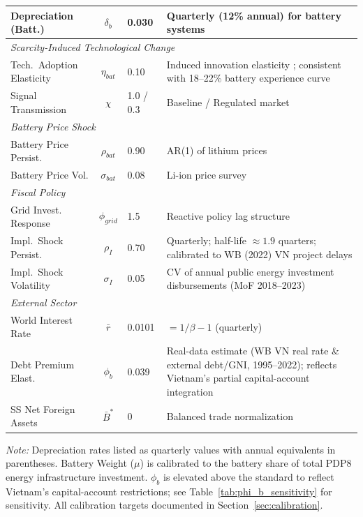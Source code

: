 \documentclass[12pt, a4paper]{article}
\begin{document}
\begin{table}[H]
\begin{tabular}{l c l p{6.5cm}}
        Depreciation (Batt.) & $\delta_b$ & 0.030 & Quarterly (12\% annual) for battery systems \\
        \midrule
        \multicolumn{4}{l}{\textit{Scarcity-Induced Technological Change}} \\
        Tech.\ Adoption Elasticity & $\eta_{bat}$ & 0.10 & Induced innovation elasticity \citep{popp2002}; consistent with 18--22\% battery experience curve \citep{kittner2017,way2022} \\
        Signal Transmission & $\chi$ & 1.0 / 0.3 & Baseline / Regulated market \\
        \midrule
        \multicolumn{4}{l}{\textit{Battery Price Shock}} \\
        Battery Price Persist. & $\rho_{bat}$ & 0.90 & AR(1) of lithium prices \citep{bloombergnef2023} \\
        Battery Price Vol. & $\sigma_{bat}$ & 0.08 & \citet{bloombergnef2023} Li-ion price survey \\
        \midrule
        \multicolumn{4}{l}{\textit{Fiscal Policy}} \\
        Grid Invest. Response & $\phi_{grid}$ & 1.5 & Reactive policy lag structure \citep{worldbank2022} \\
        Impl.\ Shock Persist. & $\rho_I$ & 0.70 & Quarterly; half-life $\approx 1.9$ quarters; calibrated to WB (2022) VN project delays \\
        Impl.\ Shock Volatility & $\sigma_I$ & 0.05 & CV of annual public energy investment disbursements (MoF 2018--2023) \\
        \midrule
        \multicolumn{4}{l}{\textit{External Sector}} \\
        World Interest Rate & $\bar{r}$ & 0.0101 & $= 1/\beta - 1$ (quarterly) \\
        Debt Premium Elast. & $\phi_b$ & 0.039 & Real-data estimate (WB VN real rate \& external debt/GNI, 1995--2022); reflects Vietnam's partial capital-account integration \\
        SS Net Foreign Assets & $\bar{B}^*$ & 0 & Balanced trade normalization \\
        \bottomrule
    \end{tabular}
    \vspace{0.2cm}
    \parbox{\textwidth}{\footnotesize \textit{Note:} Depreciation rates listed as quarterly values with annual equivalents in parentheses. Battery Weight ($\mu$) is calibrated to the battery share of total PDP8 energy infrastructure investment. $\phi_b$ is elevated above the \citet{schmittgrohe2003} standard to reflect Vietnam's capital-account restrictions; see Table~\ref{tab:phi_b_sensitivity} for sensitivity. All calibration targets documented in Section~\ref{sec:calibration}.}

\end{table}
\end{document}
